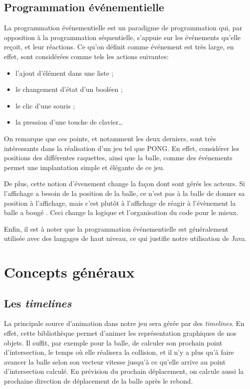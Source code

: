 \documentclass[a4paper,10pt]{article}
\theoremstyle{definition}
\begin{document}
	
  \subsection{Programmation événementielle}
	La programmation événementielle est un paradigme de programmation qui, par opposition à la programmation séquentielle, s'appuie sur les événements qu'elle reçoit, et leur réactions. Ce qu'on définit comme \og événement \fg{} est très large, en effet, sont considérées comme tels les actions suivantes:
	\begin{itemize}
		\item l'ajout d'élément dans une liste ;
		\item le changement d'état d'un booléen ;
		\item le clic d'une souris ;
		\item la pression d'une touche de clavier\dots
	\end{itemize} 
	
	On remarque que ces points, et notamment les deux derniers, sont très intéressants dans la réalisation d'un jeu tel que PONG. En effet, considérer les positions des différentes raquettes, ainsi que la balle, comme des événements permet une implantation simple et élégante de ce jeu.

	De plus, cette notion d'évenement change la façon dont sont gérés les acteurs. Si l'affichage a besoin de la position de la balle, ce n'est pas à la balle de donner sa position à l'affichage, mais c'est plutôt à l'affichage de réagir à l'évènement \og la balle a bougé \fg. Ceci change la logique et l'organisation du code pour le mieux.
	
	Enfin, il est à noter que la programmation événementielle est généralement utilisée avec des langages de haut niveau, ce qui justifie notre utilisation de Java.
	
\section{Concepts généraux}
%

    \subsection{Les \emph{timelines}}
    La principale source d'animation dans notre jeu sera gérée par des \emph{timelines}. En effet, cette bibliothèque permet d'animer les représentation graphiques de nos objets. Il suffit, par exemple pour la balle, de calculer son prochain point d'intersection, le temps où elle réalisera la collision, et il n'y a plus qu'à faire avancer la balle selon son vecteur vitesse jusqu'à ce qu'elle arrive au point d'intersection calculé. En prévision du prochain déplacement, on calcule aussi la prochaine direction de déplacement de la balle après le rebond.
    
\end{document}
